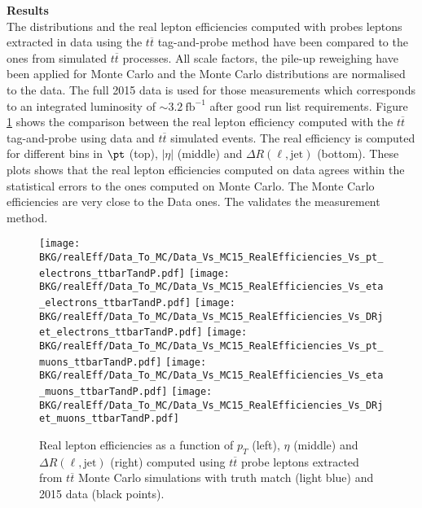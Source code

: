 	
	\par{\bf Results \\}	
	The distributions and the real lepton efficiencies computed with probes leptons extracted in data using the $t\overline{t}$ tag-and-probe method have been compared to the ones from simulated $t\overline{t}$ processes. All scale factors, the pile-up reweighing have been applied for Monte Carlo and the Monte Carlo distributions are normalised to the data. The full 2015 data is used for those measurements which corresponds to an integrated luminosity of $\sim3.2~\mathrm{fb}^{-1}$ after good run list requirements.
	Figure \ref{fig:Data_Vs_MC_RealEff_ttbar} shows the comparison between the real lepton efficiency computed with the $t\overline{t}$ tag-and-probe using data and $t\overline{t}$ simulated events. The real efficiency is computed for different bins in $\pt$ (top), $|\eta|$ (middle) and $\Delta R(\ell,\mathrm{jet})$ (bottom). These plots shows that the real lepton efficiencies computed on data agrees within the statistical errors to the ones computed on Monte Carlo. The Monte Carlo efficiencies are very close to the Data ones. The validates the measurement method.


	\begin{figure}[!htb]
	  \begin{center} 
	   \texttt{[image: BKG/realEff/Data\_To\_MC/Data\_Vs\_MC15\_RealEfficiencies\_Vs\_pt\_electrons\_ttbarTandP.pdf]} 
	   \texttt{[image: BKG/realEff/Data\_To\_MC/Data\_Vs\_MC15\_RealEfficiencies\_Vs\_eta\_electrons\_ttbarTandP.pdf]} 
	   \texttt{[image: BKG/realEff/Data\_To\_MC/Data\_Vs\_MC15\_RealEfficiencies\_Vs\_DRjet\_electrons\_ttbarTandP.pdf]} 
	   \texttt{[image: BKG/realEff/Data\_To\_MC/Data\_Vs\_MC15\_RealEfficiencies\_Vs\_pt\_muons\_ttbarTandP.pdf]} 
	   \texttt{[image: BKG/realEff/Data\_To\_MC/Data\_Vs\_MC15\_RealEfficiencies\_Vs\_eta\_muons\_ttbarTandP.pdf]} 
	   \texttt{[image: BKG/realEff/Data\_To\_MC/Data\_Vs\_MC15\_RealEfficiencies\_Vs\_DRjet\_muons\_ttbarTandP.pdf]} 
	   \caption{\label{fig:Data_Vs_MC_RealEff_ttbar} Real lepton efficiencies as a function of $p_{T}$ (left), $\eta$ (middle) and $\Delta R(\ell,\mathrm{jet})$ (right) computed using $t\overline{t}$ probe leptons extracted from $t\overline{t}$ Monte Carlo simulations with truth match (light blue) and 2015 data (black points).}
	  \end{center}
	\end{figure}	


